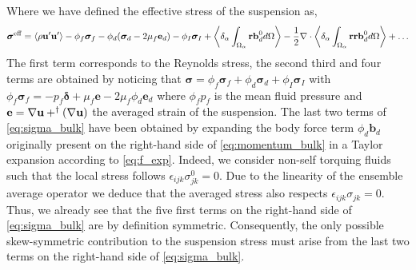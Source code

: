 Where we have defined the effective stress of the suspension as,
\begin{equation}
    \bm{\sigma}^\text{eff}
    = 
    \left<\rho\textbf{u}'\textbf{u}'\right>
    - \phi_f\bm{\sigma}_f
    - \phi_d(\bm{\sigma}_d - 2\mu_f \textbf{e}_d)
    - \phi_I \bm{\sigma}_I
    + \left<\delta_\alpha \int_{\Omega_\alpha} \textbf{r}\textbf{b}_d^0 d\Omega\right>
    -\frac{1}{2} \mathbf{\nabla}\cdot \left<\delta_\alpha \int_{\Omega_\alpha} \textbf{rr}\textbf{b}_d^0 d\Omega\right> + \ldots
    \label{eq:sigma_bulk}
\end{equation}
The first term corresponds to the Reynolds stress, the second third and four terms are obtained by noticing that $\bm\sigma = \phi_f\bm\sigma_f + \phi_d\bm\sigma_d + \phi_I \bm\sigma_I$ with 
$
    \phi_f \bm\sigma_f
    = -p_f \bm\delta
    + \mu_f \textbf{e}
    - 2 \mu_f \phi_d \textbf{e}_d 
$
where $\phi_f p_f$ is the mean fluid pressure and $\textbf{e} = \mathbf{\nabla} \textbf{u} + ^\dagger(\mathbf{\nabla} \textbf{u})$ the averaged strain of the suspension. 
The last two terms of \ref{eq:sigma_bulk} have been obtained by expanding the body force term $\phi_d \textbf{b}_d$ originally present on the right-hand side of \ref{eq:momentum_bulk} in a Taylor expansion according to \ref{eq:f_exp}. 
Indeed, we consider non-self torquing fluids such that the local stress follows  $\epsilon_{ijk} \sigma_{jk}^0 = 0 $. 
Due to the linearity of the ensemble average operator we deduce that the averaged stress also respects $\epsilon_{ijk} \sigma_{jk} =0 $. 
Thus, we already see that the five first terms on the right-hand side of \ref{eq:sigma_bulk} are by definition symmetric. 
Consequently, the only possible skew-symmetric contribution to the suspension stress must arise from the last two terms on the right-hand side of \ref{eq:sigma_bulk}.  


